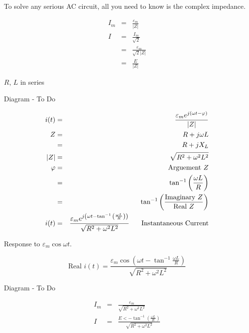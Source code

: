 \documentclass[a4paper,12pt]{article}
\begin{document}
To solve any serious AC circuit, all you need to know is the complex
impedance.

\begin{eqnarray*}
I_{m}			& = & \frac{\varepsilon_{m}}{\left| Z \right|} \\
I				& = & \frac{I_{m}}{\sqrt{2}} \\
				& = & \frac{\varepsilon_{m}}{\sqrt{2} \left| Z \right|} \\
				& = & \frac{E}{\left| Z \right|}
\end{eqnarray*}

$R$, $L$ in series

\begin{table}[hbtp]

Diagram - To Do

\end{table}

\begin{eqnarray*}
i(t)			& = & \frac{\varepsilon_{m} e^{j (\omega t -
\varphi)}}{\left| Z \right|} \\
Z				& = & R + j \omega L \\
				& = & R + j X_{L} \\
\left| Z \right| & = & \sqrt{R^{2} + \omega^{2}L^{2}} \\
\varphi & = & \mbox{Arguement } Z \\
				& = & \tan^{-1}{\left(\frac{\omega L}{R}\right)} \\
				& = & \tan^{-1}{\left(\frac{\mbox{Imaginary } Z}{\mbox{Real
				} Z}\right)} \\
i(t)			& = & \frac{\varepsilon_{m} e^{j\left(\omega t -
\tan^{-1}{\left(\frac{\omega L}{R}\right)}\right)}}{\sqrt{R^{2} +
\omega^{2}L^{2}}} \mbox{\hspace{5mm} Instantaneous Current}
\end{eqnarray*}

Response to $\varepsilon_{m} \cos{\omega t}$.

\[ \mbox{Real } i(t) = \frac{\varepsilon_{m} \cos{\left( \omega t - 
\tan^{-1}{\frac{\omega L}{R}}\right)}}{\sqrt{R^{2} + \omega^{2} L^{2}}} \]

\begin{table}[hbtp]

Diagram - To Do

\end{table}

\begin{eqnarray*}
I_{m} & = & \frac{\varepsilon_{m}}{\sqrt{R^{2} + \omega^{2} L^{2}}} \\
I		& = & \frac{E < - \tan^{-1}{\left(\frac{\omega L}{R}\right)}}{\sqrt{R^{2} 
+ \omega^{2} L^{2}}}
\end{eqnarray*}
\end{document}
